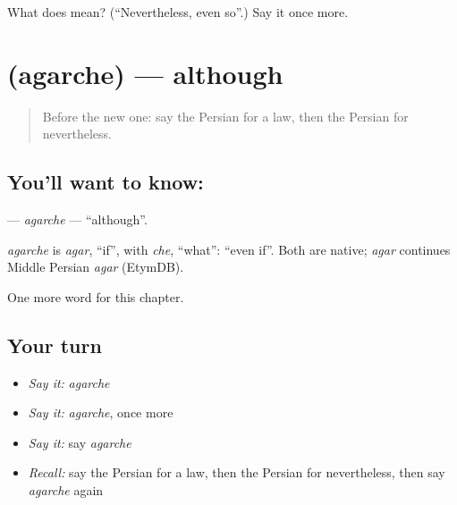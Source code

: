 \begin{tcolorbox}[breakable,colback=teal!4,colframe=teal!35!black,title={Before you move on}]
What does    mean? (\textquotedblleft{}Nevertheless, even so\textquotedblright{}.) Say it once more.
\end{tcolorbox}
\section[\texorpdfstring{\fa{اگرچه} (agarche)}{اگرچه (agarche)}]{ (agarche) — although}

\label{lesson:FA-C197-agarche}



\begin{quote}
Before the new one: say the Persian for a law, then the Persian for nevertheless.
\end{quote}

\subsection*{You'll want to know: }
\textbf{} — \emph{agarche} — \textquotedblleft{}although\textquotedblright{}.

\begin{cousinweb}
\emph{agarche} is \emph{agar}, \textquotedblleft{}if\textquotedblright{}, with \emph{che}, \textquotedblleft{}what\textquotedblright{}: \textquotedblleft{}even if\textquotedblright{}. Both are native; \emph{agar} continues Middle Persian \emph{agar} (EtymDB).
\end{cousinweb}

\begin{grammarlens}[title={What you've built}]
One more word for this chapter.
\end{grammarlens}

\subsection*{Your turn}
\begin{itemize}
\raggedright
  \item \emph{Say it:} \emph{agarche}
  \item \emph{Say it:} \emph{agarche}, once more
  \item \emph{Say it:} say \emph{agarche}
  \item \emph{Recall:} say the Persian for a law, then the Persian for nevertheless, then say \emph{agarche} again
\end{itemize}

